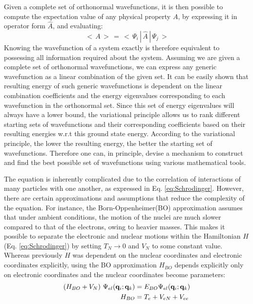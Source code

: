             Given a complete set of orthonormal wavefunctions, it is then possible to compute the expectation value of any physical property $A$, by expressing it in operator form $\hat{A}$, and evaluating:
            \begin{equation}\label{eq:expectation value}
                <\,A\,>\, =\, < \,\Psi_i\,|\,\hat{A}\,|\, \Psi_j\,>
            \end{equation}
            Knowing the wavefunction of a system exactly is therefore equivalent to possessing all information required about the system. Assuming we are given a complete set of orthonormal wavefunctions, we can express any generic wavefunction as a linear combination of the given set. It can be easily shown that resulting energy of such generic wavefunctions is dependent on the linear combination coefficients and the energy eigenvalues corresponding to each wavefunction in the orthonormal set. Since this set of energy eigenvalues will always have a lower bound, the variational principle allows us to rank different starting sets of wavefunctions and their corresponding coefficients based on their resulting energies w.r.t this ground state energy. According to the variational principle, the lower the resulting energy, the better the starting set of wavefunctions. Therefore one can, in principle, devise a mechanism to construct and find the best possible set of wavefunctions using various mathematical tools.

            The \Schrodinger{} equation is inherently complicated due to the correlation of interactions of many particles with one another, as expressed in Eq. \eqref{eq:Schrodinger}. However, there are certain approximations and assumptions that reduce the complexity of the equation. For instance, the Born-Oppenheimer(BO) approximation assumes that under ambient conditions, the motion of the nuclei are much slower compared to that of the electrons, owing to heavier masses. This makes it possible to separate the electronic and nuclear motions within the Hamiltonian $H$ (Eq. \eqref{eq:Schrodinger}) by setting $T_N \to 0$ and $V_N$ to some constant value. Whereas previously $H$ was dependent on the nuclear coordinates and electronic coordinates explicitly, using the BO approximation $H_{BO}$ depends explicitly only on electronic coordinates and the nuclear coordinates become parameters:
            \begin{equation}\label{eq:BO approximation}
                \begin{aligned}
                    (H_{BO} + V_N)~\Psi_{el} ({\mathbf {q}}_i;{\mathbf {q}}_k) &= E_{BO} \Psi_{el} ({\mathbf {q}}_i;{\mathbf {q}}_k)\\
                    H_{BO} &= T_e + V_{eN} + V_{ee}
                \end{aligned}
            \end{equation}

